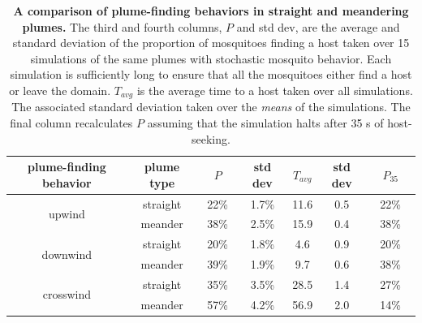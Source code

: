 \documentclass[10pt]{article}
\begin{document}
\begin{table}[!htp]
\caption{{\bf A comparison of plume-finding behaviors in straight and meandering plumes.} The third and fourth columns, $P$ and std dev, are the average and standard deviation of the proportion of mosquitoes finding a host taken over 15 simulations of the same plumes with stochastic mosquito behavior. Each simulation is sufficiently long to ensure that all the mosquitoes either find a host or leave the domain. $T_{avg}$ is the average time to a host taken over all simulations. The associated standard deviation taken over the \textit{means} of the simulations. The final column recalculates $P$ assuming that the simulation halts after 35 s of host-seeking.}
	\begin{center}
		\begin{tabular}{|c|c|c|c|c|c|c|}
			\hline
			plume-finding behavior & plume type &$ \quad P \quad $& std dev & $T_{avg}$ & std dev & $\quad P_{35} \quad$\\
			\hline
			\multirow{2}{*}{upwind} & straight &22\% & 1.7\% & 11.6 & 0.5 & 22\%\\
										&  meander & 38\% & 2.5\% & 15.9 & 0.4 & 38\%\\
										\hline
			\multirow{2}{*}{downwind} & straight &20\% & 1.8\% & 4.6 & 0.9 & 20\%\\
										&  meander & 39\% & 1.9\% & 9.7 & 0.6 & 38\%\\
										\hline
			\multirow{2}{*}{crosswind} & straight &35\% & 3.5\% & 28.5 & 1.4 & 27\%\\
										&  meander & 57\% & 4.2\% & 56.9 & 2.0 & 14\%\\
			\hline
		\end{tabular}
		\label{tab:meander}
	\end{center}
\end{table}
\end{document}
